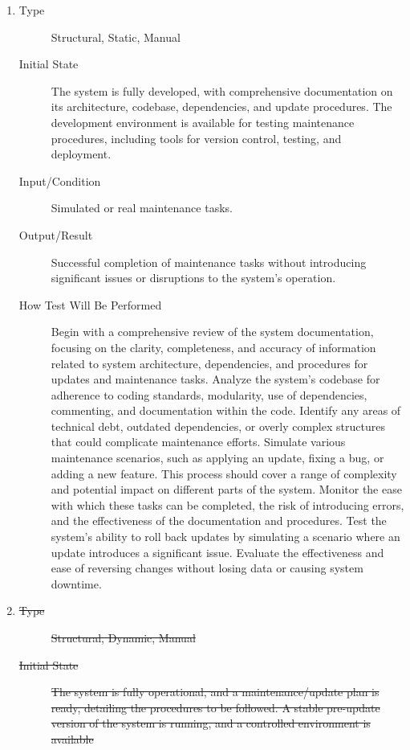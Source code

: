 \documentclass[12pt, titlepage]{article}
\begin{document}
\begin{enumerate}[NFR-T1]
\item \label{NFRT19}
  \begin{description}
  \item[Type] Structural, Static, Manual
  \item[Initial State] The system is fully developed, with comprehensive
    documentation on its architecture, codebase, dependencies, and update
    procedures. The development environment is available for testing maintenance
    procedures, including tools for version control, testing, and deployment.
  \item[Input/Condition] Simulated or real maintenance tasks.
  \item[Output/Result] Successful completion of maintenance tasks without
    introducing significant issues or disruptions to the system's operation.
  \item[How Test Will Be Performed] Begin with a comprehensive review of the
    system documentation, focusing on the clarity, completeness, and accuracy of
    information related to system architecture, dependencies, and procedures for
    updates and maintenance tasks. Analyze the system's codebase for adherence
    to coding standards, modularity, use of dependencies, commenting, and
    documentation within the code. Identify any areas of technical debt,
    outdated dependencies, or overly complex structures that could complicate
    maintenance efforts. Simulate various maintenance scenarios, such as
    applying an update, fixing a bug, or adding a new feature. This process
    should cover a range of complexity and potential impact on different parts
    of the system. Monitor the ease with which these tasks can be completed, the
    risk of introducing errors, and the effectiveness of the documentation and
    procedures. Test the system’s ability to roll back updates by simulating a
    scenario where an update introduces a significant issue. Evaluate the
    effectiveness and ease of reversing changes without losing data or causing
    system downtime.
  \end{description}
\item \label{NFRT20}
  \begin{description}
  \item[\sout{Type}] \sout{Structural, Dynamic, Manual}
  \item[\sout{Initial State}] \sout{The system is fully operational, and a maintenance/update
    plan is ready, detailing the procedures to be followed. A stable pre-update
    version of the system is running, and a controlled environment is available
}
\end{description}
\end{enumerate}
\end{document}
